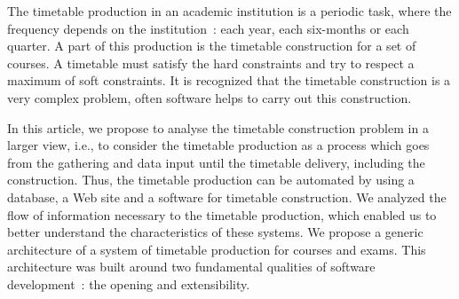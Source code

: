 The timetable production in an academic institution is a periodic
task, where the frequency depends on the institution~: each year,
each six-months or each quarter. A part of this production is the
timetable construction for a set of courses. A timetable must
satisfy the hard constraints and try to respect a maximum of soft
constraints. It is recognized that the timetable construction is a
very complex problem, often software helps to carry out this
construction.

In this article, we propose to analyse the timetable construction
problem in a larger view, i.e., to consider the timetable
production as a process which goes from the gathering and data
input until the timetable delivery, including the construction.
Thus, the timetable production can be automated by using a
database, a Web site and a software for timetable construction. We
analyzed the flow of information necessary to the timetable
production, which enabled us to better understand the
characteristics of these systems. We propose a generic
architecture of a system of timetable production for courses and
exams. This architecture was built around two fundamental
qualities of software development~: the opening and extensibility.
